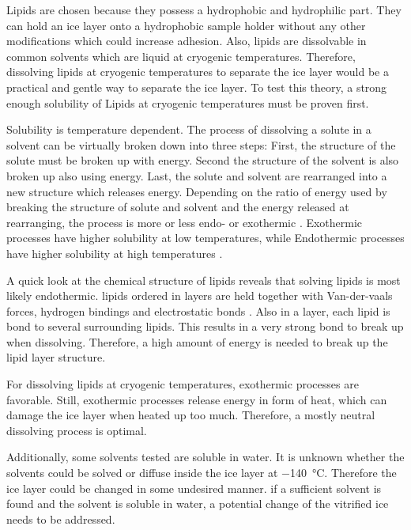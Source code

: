 
Lipids are chosen because they possess a hydrophobic and hydrophilic part. They can hold an ice layer onto a hydrophobic sample holder without any other modifications which could increase adhesion. Also, lipids are dissolvable in common solvents which are liquid at cryogenic temperatures. Therefore, dissolving lipids at cryogenic temperatures to separate the ice layer would be a practical and gentle way to separate the ice layer. To test this theory, a strong enough solubility of Lipids at cryogenic temperatures must be proven first. 

Solubility is temperature dependent. The process of dissolving a solute in a solvent can be virtually broken down into three steps: First, the structure of the solute must be broken up with energy. Second the structure of the solvent is also broken up also using energy. Last, the solute and solvent are rearranged into a new structure which releases energy. Depending on the ratio of energy used by breaking the structure of solute and solvent and the energy released at rearranging, the process is more or less endo- or exothermic \cite{ZafirJaveed.}. Exothermic processes have higher solubility at low temperatures, while Endothermic processes have higher solubility at high temperatures \cite{Mortimer.2007}. 

A quick look at the chemical structure of lipids reveals that solving lipids is most likely endothermic. lipids ordered in layers are held together with Van-der-vaals forces, hydrogen bindings and electrostatic bonds \cite{RWayneAlbers.1999}. Also in a layer, each lipid is bond to several surrounding lipids. This results in a very strong bond to break up when dissolving. Therefore, a high amount of energy is needed to break up the lipid layer structure. 

For dissolving lipids at cryogenic temperatures, exothermic processes are favorable. Still, exothermic processes release energy in form of heat, which can damage the ice layer when heated up too much. Therefore, a mostly neutral dissolving process is optimal. 

Additionally, some solvents tested are soluble in water. It is unknown whether the solvents could be solved or diffuse inside the ice layer at \SI{-140}{\degreeCelsius}. Therefore the ice layer could be changed in some undesired manner. if a sufficient solvent is found and the solvent is soluble in water, a potential change of the vitrified ice needs to be addressed.

